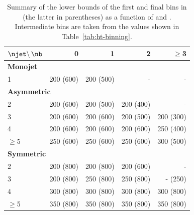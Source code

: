 \begin{table}[htb!]
  \caption{Summary of the lower bounds of the first and final bins
    in \scalht (the latter in parentheses) as a function of \njet and
    \nb. Intermediate \scalht bins are taken from the values shown in Table~\ref{tab:ht-binning}.
  \label{tab:binning-summary}}
  \centering
  \footnotesize
  \begin{tabular}{ lrrrr }
    \hline
    $\njet \backslash\, \nb$ & 0         & 1         & 2         & $\geq$3                       \\
    \hline
    \multicolumn{5}{l}{\bf Monojet}                                                              \\
    1                        & 200 (600) & 200 (500) & -     & -                         \\
    \multicolumn{5}{l}{\bf Asymmetric}                                                           \\
    2                        & 200 (600) & 200 (500) & 200 (400) & -                         \\
    3                        & 200 (600) & 200 (600) & 200 (500) & 200 (300)                     \\
    4                        & 200 (600) & 200 (600) & 200 (600) & 250 (400)                     \\
    $\geq$5                  & 250 (600) & 250 (600) & 250 (600) & 300 (500)                     \\
    \multicolumn{5}{l}{\bf Symmetric}                                                            \\
    2                        & 200 (800) & 200 (800) & 200 (600) & -                         \\
    3                        & 200 (800) & 250 (800) & 250 (800) & \phantom{0}-\phantom{0} (250) \\
    4                        & 300 (800) & 300 (800) & 300 (800) & 300 (800)                     \\
    $\geq$5                  & 350 (800) & 350 (800) & 350 (800) & 350 (800)                     \\
    \hline
  \end{tabular}
\end{table}

